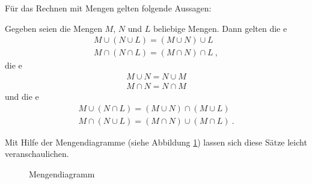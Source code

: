 
\begin{Unit}[Satz]
Für das Rechnen mit Mengen gelten folgende Aussagen:

\begin{Satz}
  Gegeben seien die Mengen $M$, $N$ und $L$ beliebige Mengen.
  Dann gelten die e
  \begin{align}
    M \cup (N \cup L) = (M \cup N) \cup L \\ 
    M \cap (N \cap L) = (M \cap N) \cap L\ ,
  \end{align}
  die e 
  \begin{align}
    M \cup N = N \cup M \\
    M \cap N = N \cap M
  \end{align}
  und die e
  \begin{align}
    M \cup (N \cap L) = (M \cup N) \cap (M \cup L) \\
    M \cap (N \cup L) = (M \cap N) \cup (M \cap L) \ .
  \end{align}
\end{Satz}

Mit Hilfe der Mengendiagramme (siehe Abbildung \ref{Abb:Mng:Mengendiagramm}) 
lassen sich diese Sätze leicht veranschaulichen.

\begin{figure}[htbp]
\begin{center}
  \caption{Mengendiagramm}
  \label{Abb:Mng:Mengendiagramm}
\end{center}
\end{figure}


\end{Unit}
